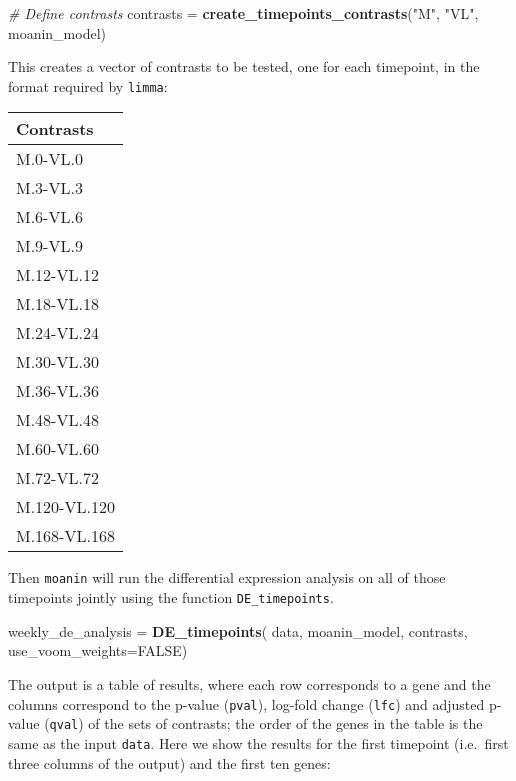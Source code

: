 \documentclass[9pt,a4paper,]{extarticle}
\newenvironment{Shaded}{\begin{snugshade}}{\end{snugshade}}
\newcommand{\CommentTok}[1]{\textcolor[rgb]{0.56,0.35,0.01}{\textit{#1}}}
\newcommand{\DataTypeTok}[1]{\textcolor[rgb]{0.13,0.29,0.53}{#1}}
\newcommand{\KeywordTok}[1]{\textcolor[rgb]{0.13,0.29,0.53}{\textbf{#1}}}
\newcommand{\NormalTok}[1]{#1}
\newcommand{\OtherTok}[1]{\textcolor[rgb]{0.56,0.35,0.01}{#1}}
\newcommand{\StringTok}[1]{\textcolor[rgb]{0.31,0.60,0.02}{#1}}
\begin{document}
\begin{Shaded}
\begin{Highlighting}[]
\CommentTok{# Define contrasts  }
\NormalTok{contrasts =}\StringTok{ }\KeywordTok{create_timepoints_contrasts}\NormalTok{(}\StringTok{"M"}\NormalTok{, }\StringTok{"VL"}\NormalTok{, moanin_model)}
\end{Highlighting}
\end{Shaded}

This creates a vector of contrasts to be tested, one for each timepoint, in the format required by \texttt{limma}:

\begin{tabular}{l}
\toprule
Contrasts\\
\midrule
M.0-VL.0\\
M.3-VL.3\\
M.6-VL.6\\
M.9-VL.9\\
M.12-VL.12\\
\addlinespace
M.18-VL.18\\
M.24-VL.24\\
M.30-VL.30\\
M.36-VL.36\\
M.48-VL.48\\
\addlinespace
M.60-VL.60\\
M.72-VL.72\\
M.120-VL.120\\
M.168-VL.168\\
\bottomrule
\end{tabular}

Then \texttt{moanin} will run the differential expression analysis on all of those timepoints
jointly using the function \texttt{DE\_timepoints}.

\begin{Shaded}
\begin{Highlighting}[]
\NormalTok{weekly_de_analysis =}\StringTok{ }\KeywordTok{DE_timepoints}\NormalTok{(}
\NormalTok{     data, moanin_model, contrasts,}
     \DataTypeTok{use_voom_weights=}\OtherTok{FALSE}\NormalTok{)}
\end{Highlighting}
\end{Shaded}

The output is a table of results, where each row corresponds to a gene and the
columns correspond to the p-value (\texttt{pval}), log-fold change (\texttt{lfc}) and
adjusted p-value (\texttt{qval}) of the sets of contrasts; the order of the genes in
the table is the same as the input \texttt{data}. Here we show the results for the
first timepoint (i.e.~first three columns of the output) and the first ten
genes:
\end{document}
